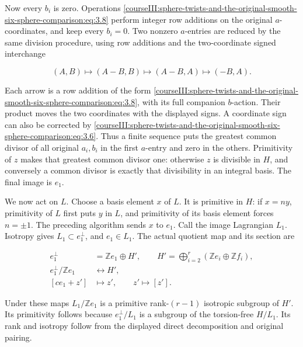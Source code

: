 Now every \(b_i\) is zero. Operations \eqref{courseIII:sphere-twists-and-the-original-smooth-six-sphere-comparison:eq:3.8} perform integer row additions on the original \(a\)-coordinates, and keep every \(b_i=0\). Two nonzero \(a\)-entries are reduced by the same division procedure, using row additions and the two-coordinate signed interchange

\begin{equation}
(A,B)\longmapsto(A-B,B)
       \longmapsto(A-B,A)
       \longmapsto(-B,A).
 \label{courseIII:sphere-twists-and-the-original-smooth-six-sphere-comparison:eq:3.9}
\end{equation}

Each arrow is a row addition of the form \eqref{courseIII:sphere-twists-and-the-original-smooth-six-sphere-comparison:eq:3.8}, with its full companion \(b\)-action. Their product moves the two coordinates with the displayed signs. A coordinate sign can also be corrected by \eqref{courseIII:sphere-twists-and-the-original-smooth-six-sphere-comparison:eq:3.6}. Thus a finite sequence puts the greatest common divisor of all original \(a_i,b_i\) in the first \(a\)-entry and zero in the others. Primitivity of \(z\) makes that greatest common divisor one: otherwise \(z\) is divisible in \(H\), and conversely a common divisor is exactly that divisibility in an integral basis. The final image is \(e_1\).

We now act on \(L\). Choose a basis element \(x\) of \(L\). It is primitive in \(H\): if \(x=ny\), primitivity of \(L\) first puts \(y\) in \(L\), and primitivity of its basis element forces \(n=\pm1\). The preceding algorithm sends \(x\) to \(e_1\). Call the image Lagrangian \(L_1\). Isotropy gives \(L_1\subset e_1^\perp\), and \(e_1\in L_1\). The actual quotient map and its section are

\begin{equation}
\begin{split}
 e_1^\perp&=\mathbb Ze_1\oplus H',\qquad
                H'=\bigoplus_{i=2}^r(\mathbb Ze_i\oplus\mathbb Zf_i),\\
 e_1^\perp/\mathbb Ze_1&\longleftrightarrow H',\\
 {}[ce_1+z']&\longmapsto z',\qquad
 z'\longmapsto[z'] .
 \end{split}
 \label{courseIII:sphere-twists-and-the-original-smooth-six-sphere-comparison:eq:3.10}
\end{equation}

Under these maps \(L_1/\mathbb Ze_1\) is a primitive rank-\((r-1)\) isotropic subgroup of \(H'\). Its primitivity follows because \(e_1^\perp/L_1\) is a subgroup of the torsion-free \(H/L_1\). Its rank and isotropy follow from the displayed direct decomposition and original pairing.

